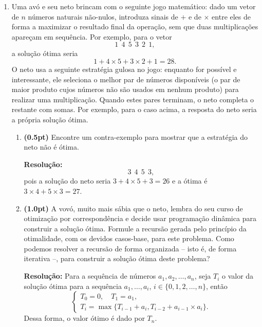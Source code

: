 \documentclass{article}
\begin{document}
\begin{enumerate}[resume*=exerc]
\item Uma avó e seu neto brincam com o seguinte jogo matemático: dado um vetor de $n$ números naturais não-nulos, introduza sinais de $+$ e de $\times$ entre eles de forma a maximizar o resultado final da operação, sem que duas multiplicações apareçam em sequência. Por exemplo, para o vetor
    \[
    1~~4~~5~~3~~2~~1,
    \]
    a solução ótima seria
    \[
    1+4\times5+3\times2+1 = 28.
    \]
    O neto usa a seguinte estratégia gulosa no jogo: enquanto for possível e interessante, ele seleciona o melhor par de números disponíveis (o par de maior produto cujos números não são usados em nenhum produto) para realizar uma multiplicação. Quando estes pares terminam, o neto completa o restante com somas. Por exemplo, para o caso acima, a resposta do neto seria a própria solução ótima.
    \begin{enumerate}[label=(\alph*),series=q6]
    \item {\bf (0.5pt)} Encontre um contra-exemplo para mostrar que a estratégia do neto não é ótima.
    \begin{framed}
    {\bf Resolução:}
    \[
    3~~4~~5~~3,
    \]
    pois a solução do neto seria $3+4\times 5+3 = 26$ e a ótima é $3\times 4+5\times 3 = 27$.
    \vspace{1cm}
    \end{framed}
    \item {\bf (1.0pt)} A vovó, muito mais sábia que o neto, lembra do seu curso de otimização por correspondência e decide usar programação dinâmica para construir a solução ótima. Formule a recursão gerada pelo princípio da otimalidade, com os devidos casos-base, para este problema. Como podemos resolver a recursão de forma organizada -- isto é, de forma iterativa --, para construir a solução ótima deste problema?
    \begin{framed}
    {\bf Resolução:}
    Para a sequência de números $a_1, a_2, \dots, a_n$, seja $T_i$ o valor da solução ótima para a sequência $a_1, \dots, a_i$, $i\in\{0,1,2,\dots,n\}$, então
    \[
    \begin{cases}
        T_0 = 0, \quad T_1 = a_1,\\
        T_i = \max\big\{T_{i-1}+a_i,T_{i-2}+a_{i-1}\times a_i\big\}.
    \end{cases}
    \]
    Dessa forma, o valor ótimo é dado por $T_n$.
    \vspace{9cm}
    \end{framed}
    \pagebreak

\end{enumerate}
\end{enumerate}
\end{document}

